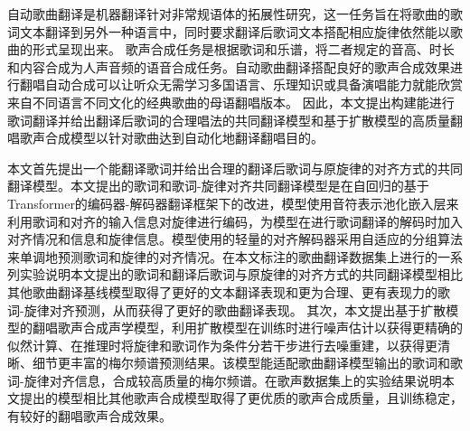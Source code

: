 \newcommand{\eg}{\textit{e}.\textit{g}.}
自动歌曲翻译是机器翻译针对非常规语体的拓展性研究，这一任务旨在将歌曲的歌词文本翻译到另外一种语言中，同时要求翻译后歌词文本搭配相应旋律依然能以歌曲的形式呈现出来。
歌声合成任务是根据歌词和乐谱，将二者规定的音高、时长和内容合成为人声音频的语音合成任务。自动歌曲翻译搭配良好的歌声合成效果进行翻唱自动合成可以让听众无需学习多国语言、乐理知识或具备演唱能力就能欣赏来自不同语言不同文化的经典歌曲的母语翻唱版本。
因此，本文提出构建能进行歌词翻译并给出翻译后歌词的合理唱法的共同翻译模型和基于扩散模型的高质量翻唱歌声合成模型以针对歌曲达到自动化地翻译翻唱目的。

本文首先提出一个能翻译歌词并给出合理的翻译后歌词与原旋律的对齐方式的共同翻译模型。本文提出的歌词和歌词-旋律对齐共同翻译模型是在自回归的基于Transformer的编码器-解码器翻译框架下的改进，模型使用音符表示池化嵌入层来利用歌词和对齐的输入信息对旋律进行编码，为模型在进行歌词翻译的解码时加入对齐情况和信息和旋律信息。模型使用的轻量的对齐解码器采用自适应的分组算法来单调地预测歌词和旋律的对齐情况。在本文标注的歌曲翻译数据集上进行的一系列实验说明本文提出的歌词和翻译后歌词与原旋律的对齐方式的共同翻译模型相比其他歌曲翻译基线模型取得了更好的文本翻译表现和更为合理、更有表现力的歌词-旋律对齐预测，从而获得了更好的歌曲翻译表现。
其次，本文提出基于扩散模型的翻唱歌声合成声学模型，利用扩散模型在训练时进行噪声估计以获得更精确的似然计算、在推理时将旋律和歌词作为条件分若干步进行去噪重建，以获得更清晰、细节更丰富的梅尔频谱预测结果。该模型能适配歌曲翻译模型输出的歌词和歌词-旋律对齐信息，合成较高质量的梅尔频谱。在歌声数据集上的实验结果说明本文提出的模型相比其他歌声合成模型取得了更优质的歌声合成质量，且训练稳定，有较好的翻唱歌声合成效果。


